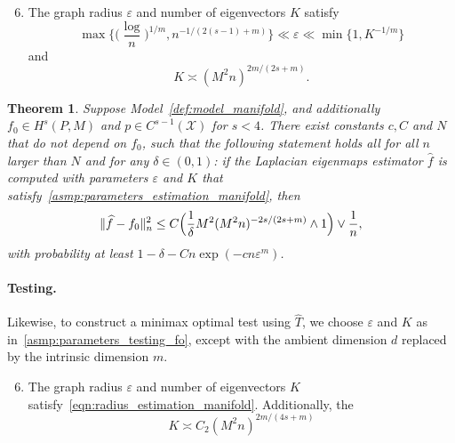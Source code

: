 \documentclass{article}
\newcommand{\1}{\mathbf{1}}
\newcommand{\mc}[1]{\mathcal{#1}}
\newcommand{\wh}[1]{\widehat{#1}}
\theoremstyle{alden}
\theoremstyle{aldenthm}
\newtheorem{theorem}{Theorem}
\theoremstyle{definition}
\theoremstyle{remark}
\begin{document}
\begin{enumerate}[label=(A\arabic*)]
	\setcounter{enumi}{5}
	\item 
	\label{asmp:parameters_estimation_manifold}
	The graph radius $\varepsilon$ and number of eigenvectors $K$ satisfy
	\begin{equation}
	\label{eqn:radius_estimation_manifold}
	\max\biggl\{\biggl(\frac{\log}{n}\biggr)^{1/m}, n^{-1/(2(s - 1) + m)}\biggr\} \ll \varepsilon \ll \min\{1, K^{-1/m}\}
	\end{equation}
	and
	\begin{equation*}
	K \asymp (M^2n)^{2m/(2s + m)}.
	\end{equation*}
\end{enumerate}

\begin{theorem}
	\label{thm:laplacian_eigenmaps_estimation_manifold}
	Suppose Model~\ref{def:model_manifold}, and additionally $f_0 \in H^s(P,M)$ and $p \in C^{s - 1}(\mc{X})$ for $s < 4$. There exist constants $c,C$ and $N$ that do not depend on $f_0$, such that the following statement holds all for all $n$ larger than $N$ and for any $\delta \in (0,1)$: if the Laplacian eigenmaps estimator $\wh{f}$ is computed with parameters $\varepsilon$ and $K$ that satisfy~\ref{asmp:parameters_estimation_manifold}, then
	\begin{equation}
	\label{eqn:laplacian_eigenmaps_estimation_manifold}
	\|\wh{f} - f_0\|_n^2 \leq C\Bigl(\frac{1}{\delta}M^2(M^2n)^{-2s/(2s + m)} \wedge 1\Bigr) \vee \frac{1}{n},
	\end{equation}
	with probability at least $1 - \delta - Cn\exp(-cn\varepsilon^m)$.
\end{theorem}

\paragraph{Testing.}
Likewise, to construct a minimax optimal test using $\wh{T}$, we choose $\varepsilon$ and $K$ as in~\ref{asmp:parameters_testing_fo}, except with the ambient dimension $d$ replaced by the intrinsic dimension $m$.
\begin{enumerate}[label=(A\arabic*)]
	\setcounter{enumi}{5}
	\item 
	\label{asmp:parameters_testing_manifold}
	The graph radius $\varepsilon$ and number of eigenvectors $K$ satisfy~\eqref{eqn:radius_estimation_manifold}. Additionally, the
	\begin{equation*}
	K \asymp C_2 (M^2n)^{2m/(4s + m)}
	\end{equation*}
\end{enumerate}
\end{document}
